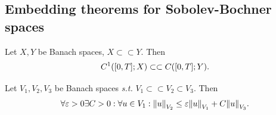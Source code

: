 \documentclass{article}
\begin{document}
\subsection{Embedding theorems for Sobolev-Bochner spaces}
\label{sec:Sobolev-Bochner}

\begin{lemma}
	Let $X,Y$ be Banach spaces, $X \subset \subset Y.$ Then
	\[
		C^1\qty([0,T];X) \subset \subset C\qty([0,T];Y).
	\]
\end{lemma}

\begin{lemma}[Ehrling]
	Let $V_1, V_2, V_3$ be Banach spaces \textit{s.t.} $V_1 \subset \subset V_2 \subset V_3.$ Then
	\[
		\forall \varepsilon >0 \exists C>0: \forall u \in V_1: \norm{u}_{V_2} \leq \varepsilon \norm{u}_{V_1}+C \norm{u}_{V_3}.
	\]
\end{lemma}
\end{document}

